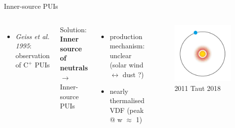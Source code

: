\documentclass{beamer}
\begin{document}
\begin{frame}{Inner-source PUIs} %
	\begin{columns}
	\column{5cm}
	\begin{itemize}
		\item \textit{Geiss et al. 1995}: observation of $\mathrm{C^+}$ PUIs
		\end{itemize}
		\vspace{0.1cm}
	 \begin{center}
	 Solution: \\ \textbf{Inner source of neutrals} \\
	 $\rightarrow$ Inner-source PUIs
	 \end{center}
	 \begin{itemize}
	 	\item production mechanism: unclear (solar wind $\leftrightarrow$ dust ?)
	 	\item nearly thermalised VDF (peak @ w $\approx$ 1)
	 \end{itemize}
		
	
	\column{6cm}
		\begin{minipage}{5cm}
		\begin{figure}
			\includegraphics[scale=0.25]{pictures/inner_source.png}
			
			\caption{\scriptsize{2011  Taut 2018}}
		\end{figure}
		\vspace{1cm}
		\end{minipage}
	\end{columns}
\end{frame}
\end{document}
